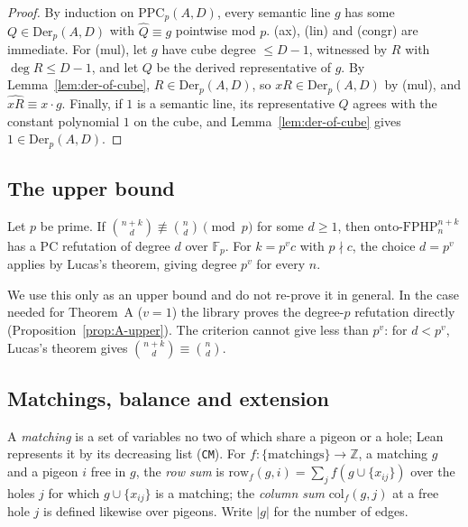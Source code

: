 \begin{proof}
By induction on $\mathrm{PPC}_p(A,D)$, every semantic line $g$ has some
$Q\in\mathrm{Der}_p(A,D)$ with $\hat Q\equiv g$ pointwise mod $p$.  (ax), (lin) and (congr)
are immediate.  For (mul), let $g$ have cube degree $\le D-1$, witnessed by $R$ with
$\deg R\le D-1$, and let $Q$ be the derived representative of $g$.  By
Lemma~\ref{lem:der-of-cube}, $R\in\mathrm{Der}_p(A,D)$, so $xR\in\mathrm{Der}_p(A,D)$ by
(mul), and $\widehat{xR}\equiv x\cdot g$.  Finally, if $1$ is a semantic line, its
representative $Q$ agrees with the constant polynomial $1$ on the cube, and
Lemma~\ref{lem:der-of-cube} gives $1\in\mathrm{Der}_p(A,D)$.
\end{proof}

\subsection{The upper bound}\label{sec:defs-upper}

\begin{proposition}\label{prop:riis}
Let $p$ be prime.  If $\binom{n+k}{d}\not\equiv\binom nd\pmod p$ for some $d\ge1$, then
$\mathrm{onto\text{-}FPHP}^{n+k}_n$ has a PC refutation of degree $d$ over $\mathbb F_p$.  For
$k=p^vc$ with $p\nmid c$, the choice $d=p^v$ applies by Lucas's theorem, giving degree
$p^{v}$ for every $n$.
\end{proposition}

We use this only as an upper bound and do not re-prove it in general.  In the case needed
for Theorem~A ($v=1$) the library proves the degree-$p$ refutation directly
(Proposition~\ref{prop:A-upper}).  The criterion cannot give less than $p^{v}$: for
$d<p^v$, Lucas's theorem gives $\binom{n+k}{d}\equiv\binom nd$.

\subsection{Matchings, balance and extension}\label{sec:defs-matchings}

A \emph{matching} is a set of variables no two of which share a pigeon or a hole;
Lean represents it by its decreasing list (\texttt{CM}).  For
$f\colon\{\text{matchings}\}\to\mathbb Z$, a matching $g$ and a pigeon $i$ free in
$g$, the \emph{row sum} is $\mathrm{row}_f(g,i)=\sum_j f(g\cup\{x_{ij}\})$ over the
holes $j$ for which $g\cup\{x_{ij}\}$ is a matching; the \emph{column sum}
$\mathrm{col}_f(g,j)$ at a free hole $j$ is defined likewise over pigeons.
Write $|g|$ for the number of edges.

